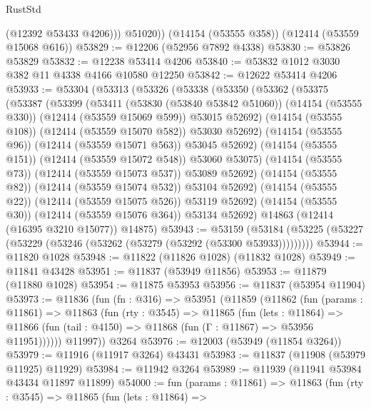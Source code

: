 \begin{lexlean}{RustStd}
\begin{coremodule}
{\begin{coremodule}
{{{{{{{{{{{{{{{{{{{{{{{{{{{{{{{{{{{{{{{{{{{{{{{{{{            (@12392 @53433 @4206)))
        @51020))
    (@14154 (@53555 @358))
    (@12414 (@53559 @15068 @616))
@53829 := @12206 (@52956 @7892 @4338)
@53830 := @53826 @53829
@53832 := @12238 @53414 @4206
@53840 := @53832 @1012 @3030 @382 @11 @4338 @4166 @10580 @12250
@53842 := @12622 @53414 @4206
@53933 := @53304
    (@53313
      (@53326
        (@53338
          (@53350
            (@53362
              (@53375
                (@53387
                  (@53399
                    (@53411
                      (@53830 (@53840 @53842 @51060))
                      (@14154 (@53555 @330))
                      (@12414 (@53559 @15069 @599))
                      @53015
                      @52692)
                    (@14154 (@53555 @108))
                    (@12414 (@53559 @15070 @582))
                    @53030
                    @52692)
                  (@14154 (@53555 @96))
                  (@12414 (@53559 @15071 @563))
                  @53045
                  @52692)
                (@14154 (@53555 @151))
                (@12414 (@53559 @15072 @548))
                @53060
                @53075)
              (@14154 (@53555 @73))
              (@12414 (@53559 @15073 @537))
              @53089
              @52692)
            (@14154 (@53555 @82))
            (@12414 (@53559 @15074 @532))
            @53104
            @52692)
          (@14154 (@53555 @22))
          (@12414 (@53559 @15075 @526))
          @53119
          @52692)
        (@14154 (@53555 @30))
        (@12414 (@53559 @15076 @364))
        @53134
        @52692)
      @14863
      (@12414 (@16395 @3210 @15077))
      @14875)
@53943 := @53159
    (@53184 (@53225 (@53227 (@53229 (@53246 (@53262 (@53279 (@53292 (@53300 @53933)))))))))
@53944 := @11820 @1028
@53948 := @11822 (@11826 @1028) (@11832 @1028)
@53949 := @11841 @43428
@53951 := @11837 (@53949 @11856)
@53953 := @11879 (@11880 @1028)
@53954 := @11875 @53953
@53956 := @11837 (@53954 @11904)
@53973 := @11836
    (fun (fn : @316) =>
    @53951
      (@11859
        (@11862
          (fun (params : @11861) =>
          @11863
            (fun (rty : @3545) =>
            @11865
              (fun (lets : @11864) =>
              @11866 (fun (tail : @4150) => @11868 (fun (Γ : @11867) => @53956 @11951))))))
        @11997))
    @3264
@53976 := @12003 (@53949 (@11854 @3264))
@53979 := @11916 (@11917 @3264) @43431
@53983 := @11837 (@11908 (@53979 @11925) @11929)
@53984 := @11942 @3264
@53989 := @11939 (@11941 @53984 @43434 @11897 @11899)
@54000 := fun (params : @11861) =>
  @11863
    (fun (rty : @3545) =>
    @11865
      (fun (lets : @11864) =>
}}}}}}}}}}}}}}}}}}}}}}}}}}}}}}}}}}}}}}}}}}}}}}}}}}
\end{coremodule}}
\end{coremodule}
\end{lexlean}
